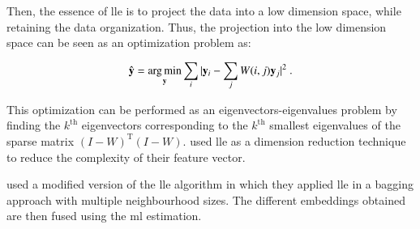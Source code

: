 Then, the essence of \ac{lle} is to project the data into a low dimension space, while retaining the data organization. Thus, the projection into the low dimension space can be seen as an optimization problem as:

\begin{equation}
	\hat{\mathbf{y}} = \operatorname*{arg\,min}_{\mathbf{y}} \sum_i | \mathbf{y}_i - \sum_j W(i,j)\mathbf{y}_j |^{2} \ .
	\label{eq:lowprojlle}
\end{equation}

This optimization can be performed as an eigenvectors-eigenvalues problem by finding the $k^{\text{th}}$ eigenvectors corresponding to the $k^{\text{th}}$ smallest eigenvalues of the sparse matrix $(I-W)^{\text{T}}(I-W)$. \cite{Tiwari2008,Tiwari2009,Viswanath2008,Viswanath2008a} used \ac{lle} as a dimension reduction technique to reduce the complexity of their feature vector.

\cite{Tiwari2008} used a modified version of the \ac{lle} algorithm in which they applied \ac{lle} in a bagging approach with multiple neighbourhood sizes. The different embeddings obtained are then fused using the \ac{ml} estimation.